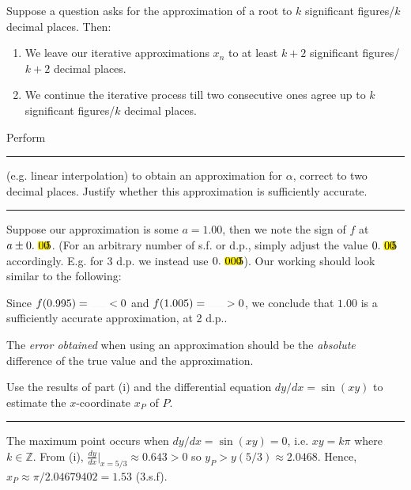 \documentclass[../Notes.tex]{subfiles}
\begin{document}
\begin{note}
    Suppose a question asks for the approximation of a root to \(k\) significant figures/\(k\) decimal places. Then: 
    \begin{enumerate}
        \item We leave our iterative approximations \(x_n\) to at least \(k+2\) significant figures/\(k+2\) decimal places.
        \item We continue the iterative process till two consecutive ones agree up to \(k\) significant figures/\(k\) decimal places.
    \end{enumerate}
\end{note}
\begin{note}
    Perform \rule{1.5cm}{0.01mm} (e.g. linear interpolation) to obtain an approximation for \(\alpha\), correct to two decimal places. Justify whether this approximation is sufficiently accurate.

    \rule{20cm-137.0549pt}{0.05mm}
    
    \vspace{0.5\baselineskip} Suppose our approximation is some \(a=1.00\), then we note the sign of \(f\) at \(a\pm 0.\highlight[yellow]{00}5\). (For an arbitrary number of s.f. or d.p., simply adjust the value \(0.\highlight[yellow]{00}5\) accordingly. E.g. for 3 d.p. we instead use \(0.\highlight[yellow]{000}5\)). Our working should look similar to the following:
    \begin{center}
        \parbox{0.9\textwidth}{
            Since \(f(0.995)=\rule{0.5cm}{0.01mm}<0\) and \(f(1.005)=\rule{0.5cm}{0.01mm}>0\), we conclude that \(1.00\) is a sufficiently accurate approximation, at 2 d.p..
        }
    \end{center}
\end{note}
\begin{note}
    The \emph{error obtained} when using an approximation should be the \emph{absolute} difference of the true value and the approximation. 
\end{note}
\begin{note}
    Use the results of part (i) and the differential equation \(dy/dx=\sin(xy)\) to estimate the \(x\)-coordinate \(x_P\) of \(P\). 

    \rule{20cm-137.0549pt}{0.05mm}

    \vspace{0.5\baselineskip} The maximum point occurs when \(dy/dx=\sin(xy)=0\), i.e. \(xy=k\pi\) where \(k\in \mathbb{Z}\). From (i), \(\frac{dy}{dx}\big|_{x=5/3}\approx 0.643>0\) so \(y_P>y(5/3)\approx 2.0468\). Hence, \(x_P\approx \pi/2.04679402=1.53\) (3.s.f).
\end{note}
\end{document}
